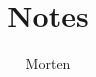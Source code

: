\documentclass[12pt]{article}
\begin{document}
\printacronyms



\title{Notes}
\author{Morten}

\maketitle









\end{document}
